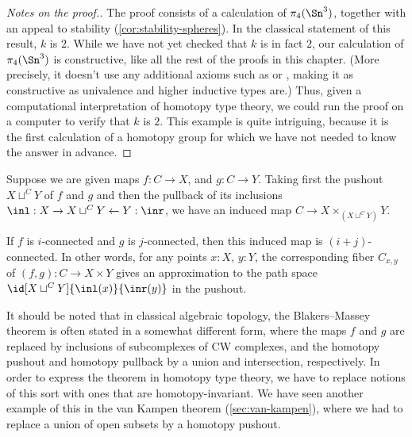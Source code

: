 {\begin{proof}[Notes on the proof.]
The proof consists of a calculation of $\pi_4(\Sn ^3)$, together with an
appeal to stability (\cref{cor:stability-spheres}).  In the classical
statement of this result, $k$ is $2$.  While we have not yet checked that
$k$ is in fact $2$, our calculation of $\pi_4(\Sn ^3)$ is constructive,
like all the rest of the proofs in this chapter.
(More precisely, it doesn't use any additional axioms such as \LEM{} or \choice{}, making it as constructive as
univalence and higher inductive types are.)  Thus, given a
computational interpretation of homotopy type theory, we could run the
proof on a computer to verify that $k$ is $2$.  This example is quite
intriguing, because it is the first calculation of a homotopy group
for which we have not needed to know the answer in advance.
\end{proof}

%

\begin{thm}\label{Blakers-Massey}
  Suppose we are given maps $f : C  \rightarrow X$, and $g : C \rightarrow Y$. Taking first the pushout $X \sqcup^C Y $ of $f$ and $g$ and then the pullback of its inclusions $\inl : X \rightarrow X \sqcup^C Y \leftarrow Y : \inr$, we have an induced map $C \to X \times_{(X \sqcup^C Y)} Y$.

  If $f$ is $i$-connected and $g$ is $j$-connected, then this induced map is $(i+j)$-connected. In other words, for any points $x:X$, $y:Y$, the corresponding fiber $C_{x,y}$ of $(f,g) : C \to X \times Y $ gives an approximation to the path space $\id[X \sqcup^C Y]{\inl(x)}{\inr(y)}$ in the pushout.
\end{thm}

It should be noted that in classical algebraic topology, the Blakers--Massey theorem is often stated in a somewhat different form, where the maps $f$ and $g$ are replaced by inclusions of subcomplexes of CW complexes, and the homotopy pushout and homotopy pullback by a union and intersection, respectively.
In order to express the theorem in homotopy type theory, we have to replace notions of this sort with ones that are homotopy-invariant.
We have seen another example of this in the van Kampen theorem (\cref{sec:van-kampen}), where we had to replace a union of open subsets by a homotopy pushout.

}
